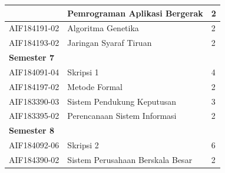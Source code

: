 \begin{table}[H]
\begin{tabular}{|p{2.85cm}|p{7.95cm}|p{1.75cm}|}
 & Pemrograman Aplikasi Bergerak           & 2   \\ \hline
AIF184191-02 & Algoritma Genetika                      & 2   \\ \hline
AIF184193-02 & Jaringan Syaraf Tiruan                  & 2   \\ \hline
\multicolumn{3}{|l|}{\textbf{Semester 7}}                    \\ \hline
AIF184091-04 & Skripsi 1                               & 4   \\ \hline
AIF184197-02 & Metode Formal                           & 2   \\ \hline
AIF183390-03 & Sistem Pendukung Keputusan              & 3   \\ \hline
AIF183395-02 & Perencanaan Sistem Informasi            & 2   \\ \hline
\multicolumn{3}{|l|}{\textbf{Semester 8}}                    \\ \hline
AIF184092-06 & Skripsi 2                               & 6   \\ \hline
AIF184390-02 & Sistem Perusahaan Berskala Besar        & 2   \\ \hline
		\end{tabular}
	\label{tab:MataKuliahTransisi}
\end{table}

